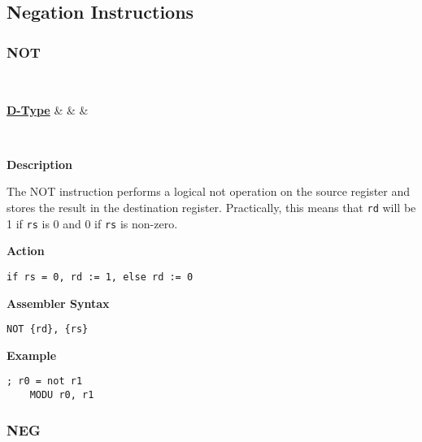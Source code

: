 \subsection{Negation Instructions}

\subsubsection{NOT }\label{sec:NOT}

\vspace{3ex}

\begin{center}
	\begin{bytefield}[leftcurly=., leftcurlyspace=0pt]{32}
		 \\
		\begin{leftwordgroup}{\hyperref[sec:t-type]{\textbf{D-Type}}}
		 & 
		 &
		 &
		\end{leftwordgroup}\\
	\end{bytefield}
\end{center}

\textbf{Description}

The NOT instruction performs a logical not operation on the source register and stores the result in the destination register.
Practically, this means that \texttt{rd} will be 1 if \texttt{rs} is 0 and 0 if \texttt{rs} is non-zero.

\vspace{3ex}

\textbf{Action}
\begin{lstlisting}[frame=single]
	if rs = 0, rd := 1, else rd := 0
\end{lstlisting}

\vspace{3ex}

\textbf{Assembler Syntax}
\begin{lstlisting}[frame=single]
	NOT {rd}, {rs}
\end{lstlisting}

\vspace{3ex}

\textbf{Example}
\begin{lstlisting}[frame=single]
	; r0 = not r1
	MODU r0, r1
\end{lstlisting}

\subsubsection{NEG }\label{sec:NEG}
 
